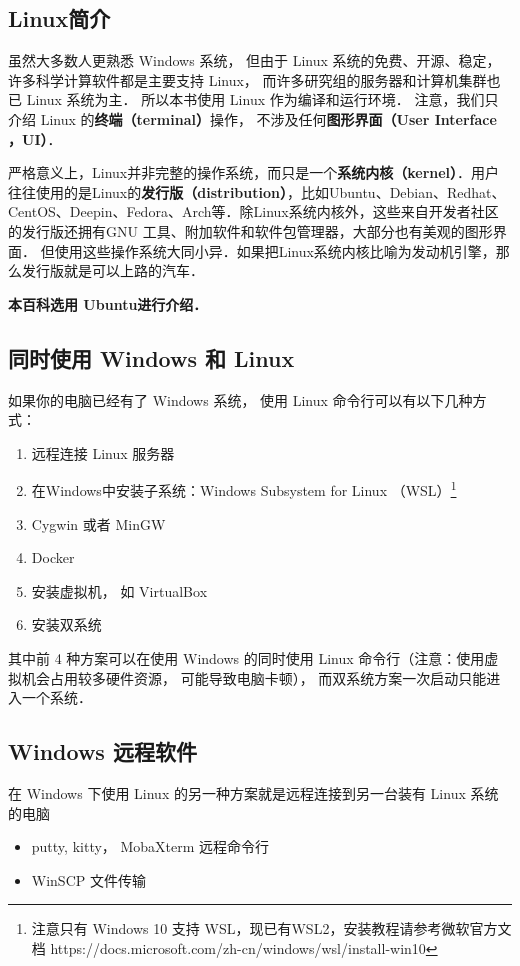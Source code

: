 
\begin{issues}
\issueTODO
\end{issues}

\subsection{Linux简介}
虽然大多数人更熟悉 Windows 系统， 但由于 Linux 系统的免费、开源、稳定， 许多科学计算软件都是主要支持 Linux， 而许多研究组的服务器和计算机集群也已 Linux 系统为主． 所以本书使用 Linux 作为编译和运行环境． 注意，我们只介绍 Linux 的\textbf{终端（terminal）}操作， 不涉及任何\textbf{图形界面（User Interface ，UI）}． 

严格意义上，Linux并非完整的操作系统，而只是一个\textbf{系统内核（kernel）}．用户往往使用的是Linux的\textbf{发行版（distribution）}，比如Ubuntu、Debian、Redhat、CentOS、Deepin、Fedora、Arch等．除Linux系统内核外，这些来自开发者社区的发行版还拥有GNU 工具、附加软件和软件包管理器，大部分也有美观的图形界面． 但使用这些操作系统大同小异．如果把Linux系统内核比喻为发动机引擎，那么发行版就是可以上路的汽车．

\textbf{本百科选用 Ubuntu进行介绍．}


\subsection{同时使用 Windows 和 Linux}
如果你的电脑已经有了 Windows 系统， 使用 Linux 命令行可以有以下几种方式：
\begin{enumerate}
\item 远程连接 Linux 服务器
\item 在Windows中安装子系统：Windows Subsystem for Linux （WSL）\footnote{注意只有 Windows 10 支持 WSL，现已有WSL2，安装教程请参考微软官方文档 https://docs.microsoft.com/zh-cn/windows/wsl/install-win10} 
\item Cygwin 或者 MinGW
\item Docker
\item 安装虚拟机， 如 VirtualBox
\item 安装双系统
\end{enumerate}
其中前 4 种方案可以在使用 Windows 的同时使用 Linux 命令行（注意：使用虚拟机会占用较多硬件资源， 可能导致电脑卡顿）， 而双系统方案一次启动只能进入一个系统．

\subsection{Windows 远程软件}
在 Windows 下使用 Linux 的另一种方案就是远程连接到另一台装有 Linux 系统的电脑
\begin{itemize}
\item putty, kitty， MobaXterm 远程命令行
\item WinSCP 文件传输
\end{itemize}



